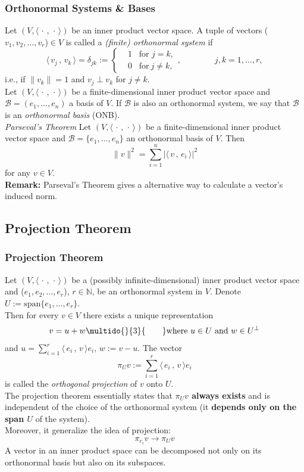 \documentclass{beamer}
\renewcommand{\emph}[1]{{\color{Turquoise3}\textsl{#1}}}
\newcommand{\N}{\mathbb{N}}
\newcommand{\myseries}[2]{$#1_1,#1_2,\dots,#1_#2$}
\newcommand{\nullspace}{~\\[15pt]}
\newcommand{\remark}{\textbf{Remark: }}
\newcommand{\scp}[2]{\langle\,#1\,,\,#2\,\rangle} \newcommand{\scpp}{\langle\,\cdot\,,\,\cdot\,\rangle}
\begin{document}
\begin{frame}[allowframebreaks]
    \frametitle{Orthonormal Systems \& Bases}
    Let $(V,\scpp)$ be an inner product vector space. A tuple of vectors (\myseries{v}{r})$\in V$ is called a \emph{(finite) orthonormal system} if
    \begin{equation*}
        \scp{v_j}{v_k}=\delta_{jk}:=\left\{\begin{aligned}&1\;\;\;\text{for }j=k,\\&0\;\;\;\text{for}~j\neq k,\end{aligned}\right.,\qquad\qquad j,k=1,\ldots,r,
    \end{equation*}
    i.e., if $\|v_k\|=1$ and $v_j\perp v_k$ for $j\neq k$.
    \nullspace
    Let $(V,\scpp)$ be a finite-dimensional inner product vector space and $\mathcal{B}=(e_1,\ldots,e_n)$ a basis of $V$. If $\mathcal{B}$ is also an orthonormal system, we say that $\mathcal{B}$ is an \emph{orthonormal basis} (ONB).\\
    \newpage
    \emph{Parseval’s Theorem} Let $(V,\scpp)$ be a finite-dimensional inner product vector space and $\mathcal{B}=\{e_1,\ldots,e_n\}$ an orthonormal basis of $V$. Then
    \begin{equation*}
        \|v\|^2=\sum_{i=1}^{n}|\scp{v}{e_i}|^2
    \end{equation*}
    for any $v\in V$.
    \nullspace
    \remark Parseval’s Theorem gives a alternative way to calculate a vector's induced norm.
\end{frame}

\subsection{Projection Theorem}
\begin{frame}[allowframebreaks]
    \frametitle{Projection Theorem}
    Let $(V,\scpp)$ be a (possibly infinite-dimensional) inner product vector space and (\myseries{e}{r}), $r\in\N$, be an orthonormal system in $V$. Denote $U:=\text{span}\{e_1,\ldots,e_r\}.$\\
    Then for every $v\in V$ there exists a unique representation
    \begin{equation*}
        v=u+w\multido{}{3}{\qquad}\text{where}~u\in U~\text{and}~w\in U^{\perp}
    \end{equation*}
    and $u=\sum\limits_{i=1}^{r}\scp{e_i}{v}e_i,\,w:=v-u.$
    The vector
    \begin{equation*}
        \pi_Uv:=\sum_{i=1}^{r}\scp{e_i}{v}e_i
    \end{equation*}
    is called the \emph{orthogonal projection} of $v$ onto $U$.\\
    \newpage
    The projection theorem essentially states that \textbf{$\pi_Uv$ always exists} and is independent of the choice of the orthonormal system (it \textbf{depends only on the span $U$} of the system).
    \nullspace
    Moreover, it generalize the idea of projection:
    $$
        \pi_{e_i}v\rightarrow\pi_Uv
    $$
    A vector in an inner product space can be decomposed not only on its orthonormal basis but also on its subspaces.
\end{frame}
\end{document}
